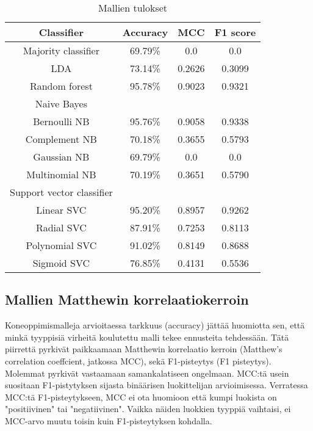 \documentclass[finnish,twoside,openright]{HYgraduMLDS}
\begin{document}
\begin{table}
    \centering
    \begin{tabular}{||c | c c c||} 
        \hline
        Classifier & Accuracy & MCC & F1 score \\ [0.5ex] 
        \hline\hline
        Majority classifier & 69.79\% & 0.0 & 0.0 \\ 
        \hline
        LDA & 73.14\% & 0.2626 & 0.3099 \\
        \hline
        Random forest & 95.78\% & 0.9023 & 0.9321 \\
        \hline
        \hline
        Naive Bayes & & & \\
        \hline
        Bernoulli NB & 95.76\% & 0.9058 & 0.9338 \\
        Complement NB & 70.18\% & 0.3655 & 0.5793 \\
        Gaussian NB & 69.79\% & 0.0 & 0.0 \\
        Multinomial NB & 70.19\% & 0.3651 & 0.5790 \\
        \hline
        \hline
        Support vector classifier & & & \\
        \hline
        Linear SVC & 95.20\% & 0.8957 & 0.9262 \\
        Radial SVC & 87.91\% & 0.7253 & 0.8113 \\
        Polynomial SVC & 91.02\% & 0.8149 & 0.8688 \\
        Sigmoid SVC & 76.85\% & 0.4131 & 0.5536 \\
        \hline
    \end{tabular}
    \caption{Mallien tulokset}
    \label{table:results}
\end{table}


\subsection{Mallien Matthewin korrelaatiokerroin}

Koneoppimismalleja arvioitaessa tarkkuus (accuracy) jättää huomiotta sen, että minkä tyyppisiä virheitä koulutettu malli tekee ennusteita tehdessään. Tätä piirrettä pyrkivät paikkaamaan Matthewin korrelaatio kerroin (Matthew's correlation coeffcient, jatkossa MCC), sekä F1-pisteytys (F1 pisteytys). Molemmat pyrkivät vastaamaan samankalatiseen ongelmaan. MCC:tä usein suositaan F1-pistytyksen sijasta\cite{chicco2020advantages} binäärisen luokittelijan arvioimisessa. Verratessa MCC:tä F1-pisteytykseen, MCC ei ota huomioon että kumpi luokista on "positiivinen" tai "negatiivinen". Vaikka näiden luokkien tyyppiä vaihtaisi, ei MCC-arvo muutu toisin kuin F1-pisteytyksen kohdalla.
\end{document}

